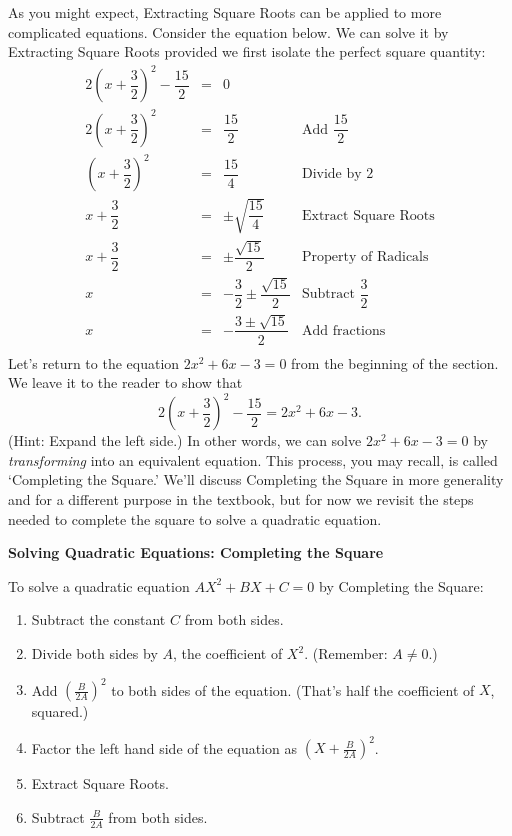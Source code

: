 \documentclass[11pt]{article}
\theoremstyle{definition}  %
\newcommand{\bbm}{\begin{boxedminipage}{6.41in}}
\newcommand{\ebm}{\end{boxedminipage}}
\begin{document}
As you might expect, Extracting Square Roots can be applied to more complicated equations.  Consider the equation below.  We can solve it by Extracting Square Roots provided we first isolate the perfect square quantity:\[ \begin{array}{rclr}

2\left(x + \dfrac{3}{2}\right)^2 - \dfrac{15}{2} & = & 0 & \\ [8pt]
2\left(x + \dfrac{3}{2}\right)^2 & = & \dfrac{15}{2} & \text{Add $\dfrac{15}{2}$} \\
\left(x + \dfrac{3}{2}\right)^2 & = & \dfrac{15}{4} & \text{Divide by $2$} \\
x + \dfrac{3}{2} & = & \pm \sqrt{\dfrac{15}{4}} & \text{Extract Square Roots} \\ [8pt]
x + \dfrac{3}{2} & = & \pm \dfrac{\sqrt{15}}{2} & \text{Property of Radicals} \\ [5pt]
x & = & -\dfrac{3}{2} \pm \dfrac{\sqrt{15}}{2}  & \text{Subtract $\dfrac{3}{2}$} \\ [8pt]
x & = & -\dfrac{3 \pm \sqrt{15}}{2}  & \text{Add fractions} \\

\end{array} \] Let's return to the equation $2x^2 + 6x - 3 = 0$ from the beginning of the section.  We leave it to the reader to show that \[2\left(x + \dfrac{3}{2}\right)^2 - \dfrac{15}{2} =  2x^2 + 6x - 3. \] (Hint: Expand the left side.)  In other words, we can solve $2x^2 + 6x - 3 = 0$  by \textit{transforming} into an equivalent equation. This process, you may recall, is called `Completing the Square.'  We'll discuss Completing the Square in more generality and for a different purpose in the textbook, but for now we revisit the steps needed to complete the square to solve a quadratic equation.

\medskip

\label{completesquareeqns}

\colorbox{ResultColor}{\bbm

\centerline{\textbf{Solving Quadratic Equations:  Completing the Square}}
\vspace{0.05in}
To solve a quadratic equation $AX^2 + BX + C = 0$ by Completing the Square:

\begin{enumerate}

\item  Subtract the constant $C$ from both sides.
\item  Divide both sides by $A$,  the coefficient of $X^2$.  (Remember:  $A \neq 0$.)
\item  Add $\left(\frac{B}{2A}\right)^2$ to both sides of the equation. (That's half the coefficient of $X$, squared.)
\vspace{-0.1in}
\item  Factor the left hand side of the equation as $\left(X + \frac{B}{2A}\right)^2$.
\item  Extract Square Roots.
\item  Subtract $\frac{B}{2A}$ from both sides.

\end{enumerate}

\ebm}
\end{document}
